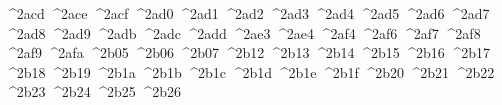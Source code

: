 {  ^^^^2acd%
  ^^^^2ace%
  ^^^^2acf%
  ^^^^2ad0%
  ^^^^2ad1%
  ^^^^2ad2%
  ^^^^2ad3%
  ^^^^2ad4%
  ^^^^2ad5%
  ^^^^2ad6%
  ^^^^2ad7%
  ^^^^2ad8%
  ^^^^2ad9%
  ^^^^2adb%
  ^^^^2adc%
  ^^^^2add%
  ^^^^2ae3%
  ^^^^2ae4%
  ^^^^2af4%
  ^^^^2af6%
  ^^^^2af7%
  ^^^^2af8%
  ^^^^2af9%
  ^^^^2afa%
  ^^^^2b05%
  ^^^^2b06%
  ^^^^2b07%
  ^^^^2b12%
  ^^^^2b13%
  ^^^^2b14%
  ^^^^2b15%
  ^^^^2b16%
  ^^^^2b17%
  ^^^^2b18%
  ^^^^2b19%
  ^^^^2b1a%
  ^^^^2b1b%
  ^^^^2b1c%
  ^^^^2b1d%
  ^^^^2b1e%
  ^^^^2b1f%
  ^^^^2b20%
  ^^^^2b21%
  ^^^^2b22%
  ^^^^2b23%
  ^^^^2b24%
  ^^^^2b25%
  ^^^^2b26%
}
